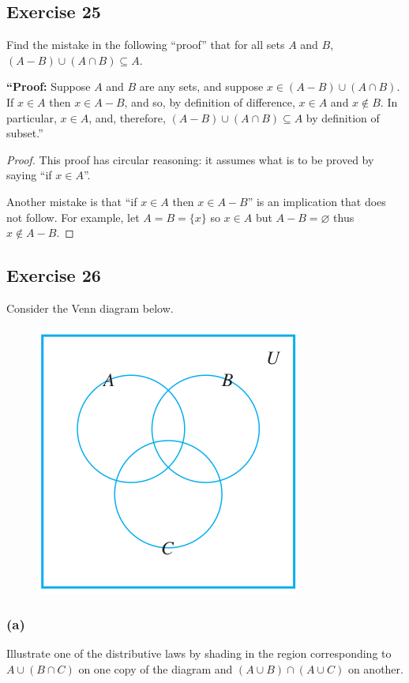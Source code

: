 \documentclass[14pt]{extarticle}
\newcommand{\es}{\varnothing}
\begin{document}
\subsection{Exercise 25}
Find the mistake in the following “proof” that for all sets $A$ and $B$, \((A - B) \cup (A \cap B) \subseteq A\).

{\bf “Proof:} Suppose $A$ and $B$ are any sets, and suppose \(x \in (A - B) \cup (A \cap B)\). If \(x \in A\) then 
\(x \in A - B\), and so, by definition of difference, \(x \in A\) and \(x \notin B\). In particular, \(x \in A\), 
and, therefore, \((A - B) \cup (A \cap B) \subseteq A\) by definition of subset.”

\begin{proof}
This proof has circular reasoning: it assumes what is to be proved by saying ``if $x \in A$''.

Another mistake is that ``if $x \in A$ then \(x \in A - B\)'' is an implication that does not follow. For example,
let $A = B = \{x\}$ so $x \in A$ but $A - B = \es$ thus $x \notin A - B$.
\end{proof}

\subsection{Exercise 26}
Consider the Venn diagram below.

\begin{figure}[ht!]
\centering
\includegraphics[scale=0.4]{../images/6.2.26.png}
\end{figure}

\subsubsection{(a)}
Illustrate one of the distributive laws by shading in the region corresponding to \(A \cup (B \cap C)\) on one copy 
of the diagram and \((A \cup B) \cap (A \cup C)\) on another.
\end{document}

